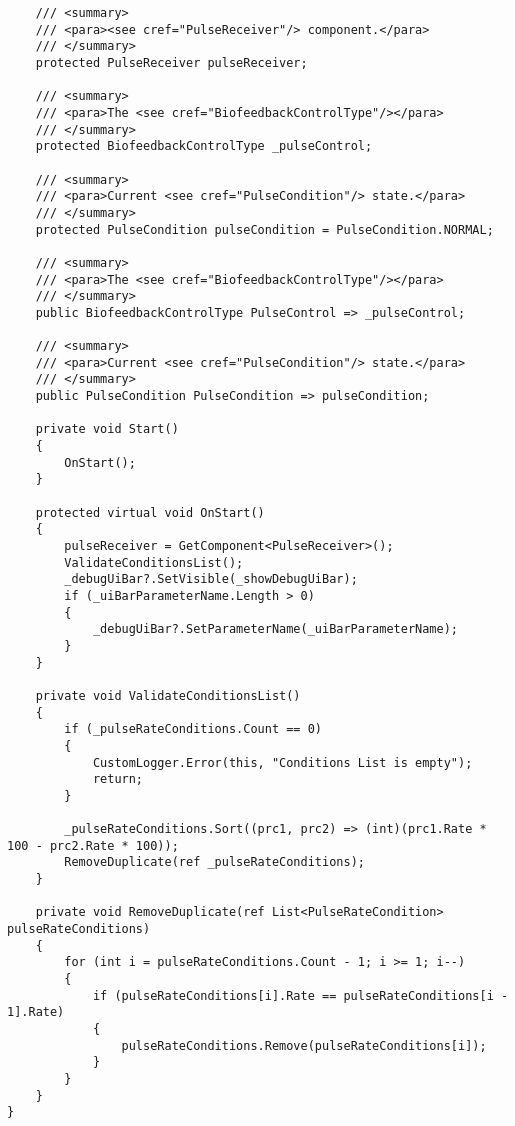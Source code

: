 \begin{verbatim}
    /// <summary>
    /// <para><see cref="PulseReceiver"/> component.</para>
    /// </summary>
    protected PulseReceiver pulseReceiver;

    /// <summary>
    /// <para>The <see cref="BiofeedbackControlType"/></para>
    /// </summary>
    protected BiofeedbackControlType _pulseControl;

    /// <summary>
    /// <para>Current <see cref="PulseCondition"/> state.</para>
    /// </summary>
    protected PulseCondition pulseCondition = PulseCondition.NORMAL;

    /// <summary>
    /// <para>The <see cref="BiofeedbackControlType"/></para>
    /// </summary>
    public BiofeedbackControlType PulseControl => _pulseControl;

    /// <summary>
    /// <para>Current <see cref="PulseCondition"/> state.</para>
    /// </summary>
    public PulseCondition PulseCondition => pulseCondition;

    private void Start()
    {
        OnStart();
    }

    protected virtual void OnStart()
    {
        pulseReceiver = GetComponent<PulseReceiver>();
        ValidateConditionsList();
        _debugUiBar?.SetVisible(_showDebugUiBar);
        if (_uiBarParameterName.Length > 0)
        {
            _debugUiBar?.SetParameterName(_uiBarParameterName);
        }
    }

    private void ValidateConditionsList()
    {
        if (_pulseRateConditions.Count == 0)
        {
            CustomLogger.Error(this, "Conditions List is empty");
            return;
        }

        _pulseRateConditions.Sort((prc1, prc2) => (int)(prc1.Rate * 100 - prc2.Rate * 100));
        RemoveDuplicate(ref _pulseRateConditions);
    }

    private void RemoveDuplicate(ref List<PulseRateCondition> pulseRateConditions)
    {
        for (int i = pulseRateConditions.Count - 1; i >= 1; i--)
        {
            if (pulseRateConditions[i].Rate == pulseRateConditions[i - 1].Rate)
            {
                pulseRateConditions.Remove(pulseRateConditions[i]);
            }
        }
    }
}
\end{verbatim}
